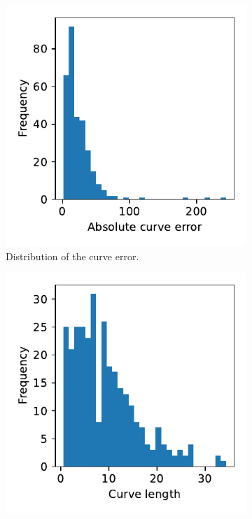 \begin{figure}[h]
    \centering
    \begin{subfigure}{.3\textwidth}
        \includegraphics[width=\textwidth]{graphics/eval/curve_error.pdf}
        \caption{Distribution of the curve error.}
        \label{fig:example.metric.distributions.curve_error}
    \end{subfigure}
    \begin{subfigure}{.3\textwidth}
        \includegraphics[width=\textwidth]{graphics/eval/curve_length.pdf}

\end{subfigure}
\end{figure}
